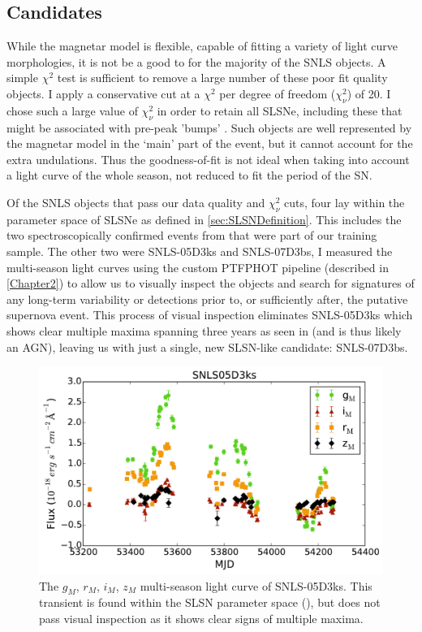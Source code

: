 \subsection{Candidates}
\label{sec:SLSNCands}
While the magnetar model is flexible, capable of fitting a variety of light curve morphologies, it is not be a good to for the majority of the SNLS objects. A simple $\chi^2$ test is sufficient to remove a large number of these poor fit quality objects. I apply a conservative cut at a $\chi^2$ per degree of freedom ($\chi^2_{\nu}$) of 20. I chose such a large value of $\chi^2_{\nu}$ in order to retain all SLSNe, including these that might be associated with pre-peak 'bumps' \citep{Nicholl2016,Nicholl2015a,Smith2016}. Such objects are well represented by the magnetar model in the `main' part of the event, but it cannot account for the extra undulations. Thus the goodness-of-fit is not ideal when taking into account a light curve of the whole season, not reduced to fit the period of the SN.

Of the SNLS objects that pass our data quality and $\chi^2_{\nu}$ cuts, four lay within the parameter space of SLSNe as defined in \ref{sec:SLSNDefinition}. This includes the two spectroscopically confirmed events from \citet{Howell2013} that were part of our training sample. The other two were SNLS-05D3ks and SNLS-07D3bs, I  measured the multi-season light curves using the custom \textsc{PTFPHOT} pipeline (described in \cref{Chapter2}) to allow us to visually inspect the objects and search for signatures of any long-term variability or detections prior to, or sufficiently after, the putative supernova event. This process of visual inspection eliminates SNLS-05D3ks which shows clear multiple maxima spanning three years as seen in  (and is thus likely an AGN), leaving us with just a single, new SLSN-like candidate: SNLS-07D3bs.

\begin{figure}
\centering
\includegraphics[width=\textwidth]{Figures/Chapter4/SNLS05D3ks}
\caption{The $g_M$, $r_M$, $i_M$, $z_M$ multi-season light curve of SNLS-05D3ks. This transient is found within the SLSN parameter space (), but does not pass visual inspection as it shows clear signs of multiple maxima.}
\label{fig:05D3ks}
\end{figure}

